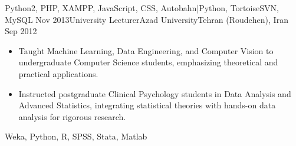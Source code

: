 \begin{experiences}
{\begin{itemize}
		\end{itemize}
	}
	{Python2, PHP, XAMPP, JavaScript, CSS, Autobahn|Python, TortoiseSVN, MySQL}
	\emptySeparator
	\experience
	{Nov 2013}{University Lecturer}{Azad University}{Tehran (Roudehen), Iran}
	{Sep 2012} {
		\begin{itemize}
    \item Taught Machine Learning, Data Engineering, and Computer Vision to undergraduate Computer Science students, emphasizing theoretical and practical applications.
\item Instructed postgraduate Clinical Psychology students in Data Analysis and Advanced Statistics, integrating statistical theories with hands-on data analysis for rigorous research.


		\end{itemize}
	}
	{Weka, Python, R, SPSS, Stata, Matlab}
\end{experiences}
